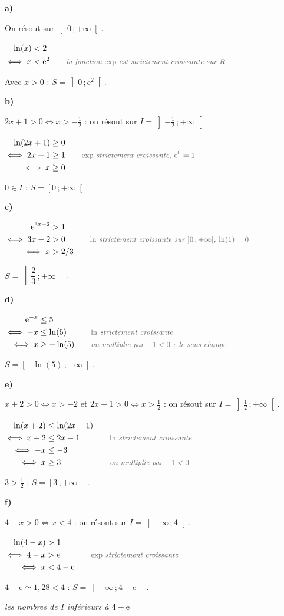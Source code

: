 \documentclass[11pt,a4paper]{article}
\makeatletter
\newcommand{\R}{\mathbb{R}}
\newcommand{\N}{\mathbb{N}}
\newcommand{\Z}{\mathbb{Z}}
\newcommand{\Q}{\mathbb{Q}}
\renewcommand{\approx}{\simeq}
\newcommand{\vect}[1]{\overrightarrow{#1}}
\newcommand{\fois}[1]{\times{\color{coulExo}#1}}
\newcommand{\lycee@intfo}[2]{\left[#1\,;#2\right[}
\newcommand{\lycee@intoo}[2]{\left]#1\,;#2\right[}
\providecommand{\Cf}{\mathcal{C}\sb{f}}%
\providecommand{\Cg}{\mathcal{C}\sb{g}}%
\providecommand{\intfo}{\lycee@intfo}%
\providecommand{\intoo}{\lycee@intoo}%
\def\R{R}\def\N{N}\def\Z{Z}\def\Q{Q}\def\vect#1{#1}\def\Cf{Cf}\def\Cg{Cg}\def\fois#1{×#1}%
\newcounter{exo}
\newenvironment{exo}[1][\relax]{\refstepcounter{exo}\begin{exercice}[#1]}{\end{exercice}}
\newcommand{\res}[1]{{\color{coulRep}#1}}
\newenvironment{calculs}{\par\smallskip\noindent$\displaystyle\begin{aligned}[t]}%
  {\end{aligned}$\par\smallskip}
\newcommand{\justif}[1]{\quad\text{\small\itshape\color{black!60}#1}}
\newcommand{\cas}[1]{\par\smallskip\noindent\textbf{\color{coulExo}#1}\vadjust{\nobreak}}
\newcommand{\explique}[2]{\par\smallskip\noindent
  \begin{minipage}[t]{0.6\linewidth}\raggedright #1\end{minipage}\hfill
  \begin{minipage}[t]{0.37\linewidth}\raggedright\leavevmode
    {\small\itshape\color{black!60}#2}\end{minipage}\par}
\let\casligne\cas
\renewcommand{\cas}[1]{\casligne{#1}\par\nopagebreak}
\newcommand{\e}{\mathrm{e}}
\makeatother
\begin{document}
\begin{exo}[Inéquations]
\cas{a)}
\explique{On résout sur $\intoo{0}{+\infty}$.}{}
\begin{calculs}
\ln(x) &< 2 &&\\
\iff x &< \e^{2} &&\justif{la fonction $\exp$ est strictement croissante sur $\R$}
\end{calculs}
\explique{Avec $x>0$ : \res{$S=\intoo{0}{\e^{2}}$}.}{}
\cas{b)}
\explique{$2x+1>0\iff x>-\frac{1}{2}$ : on résout sur $I=\intoo{-\frac{1}{2}}{+\infty}$.}{}
\begin{calculs}
\ln(2x+1) &\geq 0 &&\\
\iff 2x+1 &\geq 1 &&\justif{$\exp$ strictement croissante, $\e^{0}=1$}\\
\iff x &\geq 0 &&
\end{calculs}
\explique{$0\in I$ : \res{$S=\intfo{0}{+\infty}$}.}{}
\cas{c)}
\begin{calculs}
\e^{3x-2} &> 1 &&\\
\iff 3x-2 &> 0 &&\justif{$\ln$ strictement croissante sur $\intoo{0}{+\infty}$, $\ln(1)=0$}\\
\iff x &> \frac{2}{3} &&
\end{calculs}
\explique{\res{$S=\intoo{\dfrac{2}{3}}{+\infty}$}.}{}
\cas{d)}
\begin{calculs}
\e^{-x} &\leq 5 &&\\
\iff -x &\leq \ln(5) &&\justif{$\ln$ strictement croissante}\\
\iff x &\geq -\ln(5) &&\justif{on multiplie par $-1<0$ : le sens change}
\end{calculs}
\explique{\res{$S=\intfo{-\ln(5)}{+\infty}$}.}{}
\cas{e)}
\explique{$x+2>0\iff x>-2$ et $2x-1>0\iff x>\frac{1}{2}$ : on résout sur
$I=\intoo{\frac{1}{2}}{+\infty}$.}{}
\begin{calculs}
\ln(x+2) &\leq \ln(2x-1) &&\\
\iff x+2 &\leq 2x-1 &&\justif{$\ln$ strictement croissante}\\
\iff -x &\leq -3 &&\\
\iff x &\geq 3 &&\justif{on multiplie par $-1<0$}
\end{calculs}
\explique{$3>\frac{1}{2}$ : \res{$S=\intfo{3}{+\infty}$}.}{}
\cas{f)}
\explique{$4-x>0\iff x<4$ : on résout sur $I=\intoo{-\infty}{4}$.}{}
\begin{calculs}
\ln(4-x) &> 1 &&\\
\iff 4-x &> \e &&\justif{$\exp$ strictement croissante}\\
\iff x &< 4-\e &&
\end{calculs}
\explique{$4-\e\approx 1{,}28<4$ : \res{$S=\intoo{-\infty}{4-\e}$}.}{les nombres de $I$ inférieurs à $4-\e$}
\end{exo}
\end{document}
